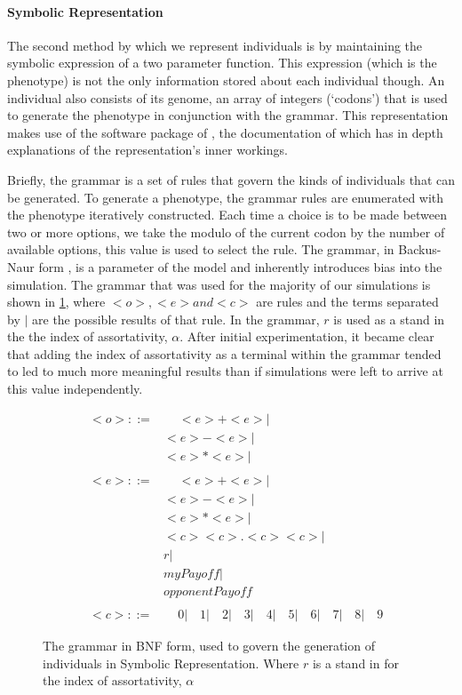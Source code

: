 \documentclass[11pt]{book}
\newcommand*{\np}{\par\noindent\newline}
\begin{document}
\paragraph{Symbolic Representation}
\np The second method by which we represent individuals is by maintaining the symbolic expression of a two parameter function.
This expression (which is the phenotype) is not the only information stored about each individual though.
An individual also consists of its genome, an array of integers (`codons') that is used to generate the phenotype in conjunction with the grammar.
This representation makes use of the software package of \citet{fenton_ponyge2:_2017}, the documentation of which has in depth explanations of the representation's inner workings.

\np Briefly, the grammar is a set of rules that govern the kinds of individuals that can be generated.
To generate a phenotype, the grammar rules are enumerated with the phenotype iteratively constructed.
Each time a choice is to be made between two or more options, we take the modulo of the current codon by the number of available options, this value is used to select the rule.
The grammar, in Backus-Naur form \citep{oneill_grammatical_2001}, is a parameter of the model and inherently introduces bias into the simulation.
The grammar that was used for the majority of our simulations is shown in \ref{grammar}, where $<o>, <e> and <c>$ are rules and the terms separated by $|$ are the possible results of that rule.
In the grammar, $r$ is used as a stand in the the index of assortativity, $\alpha$.
After initial experimentation, it became clear that adding the index of assortativity as a terminal within the grammar
tended to led to much more meaningful results than if simulations were left to arrive at this value independently.
\begin{figure}[]
	\centering
	\begin{align*}
		&<o> ::= \qquad <e>+<e>|\\
		& \qquad \qquad \qquad <e>-<e>| \nonumber \\
		& \qquad \qquad \qquad <e>*<e>| \nonumber \\ \nonumber \\
		&<e> ::= \qquad <e>+<e>| \nonumber \\
		&\qquad \qquad \qquad <e>-<e>| \nonumber \\
		&\qquad \qquad \qquad <e>*<e>| \nonumber \\
		&\qquad \qquad \qquad <c><c>.<c><c>| \nonumber \\
		&\qquad \qquad \qquad r| \nonumber \\
		&\qquad \qquad \qquad myPayoff| \nonumber \\
		&\qquad \qquad \qquad opponentPayoff \nonumber \\ \nonumber \\
		&<c>  ::= \qquad 0 | \quad 1 |\quad 2 |\quad 3 |\quad 4 |\quad 5 |\quad 6 |\quad 7 |\quad 8 |\quad 9 \nonumber
	\end{align*}
\caption{The grammar in BNF form, used to govern the generation of individuals in Symbolic Representation. Where $r$ is a stand in for the index of assortativity, $\alpha$}
\label{grammar}
\end{figure}
\end{document}
